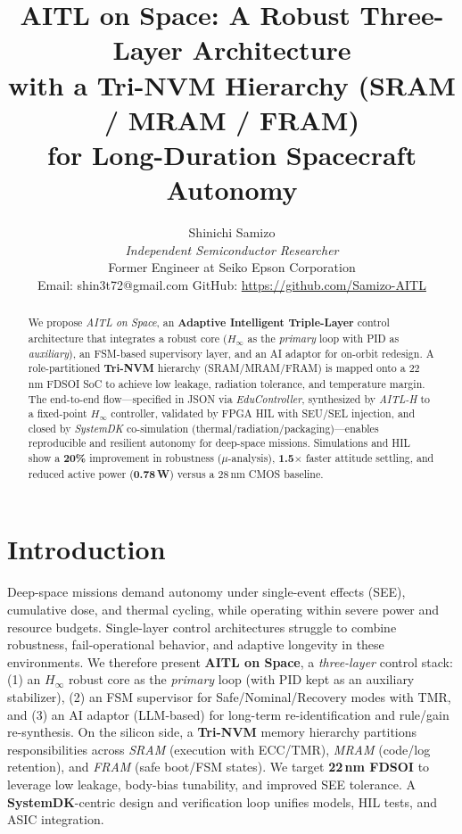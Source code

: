 \documentclass[conference]{IEEEtran}
\begin{document}
\title{AITL on Space: A Robust Three-Layer Architecture\\
with a Tri-NVM Hierarchy (SRAM / MRAM / FRAM)\\
for Long-Duration Spacecraft Autonomy}

\author{%
Shinichi Samizo\\
\emph{Independent Semiconductor Researcher}\\
Former Engineer at Seiko Epson Corporation\\
Email: shin3t72@gmail.com \quad GitHub: \url{https://github.com/Samizo-AITL}
}

\maketitle

\begin{abstract}
We propose \emph{AITL on Space}, an \textbf{Adaptive Intelligent Triple-Layer} control
architecture that integrates a robust core ($H_\infty$ as the \emph{primary} loop with PID as
\emph{auxiliary}), an FSM-based supervisory layer, and an AI adaptor for on-orbit redesign.
A role-partitioned \textbf{Tri-NVM} hierarchy (SRAM/MRAM/FRAM) is mapped onto a 22\,nm FDSOI
SoC to achieve low leakage, radiation tolerance, and temperature margin. The end-to-end
flow---specified in JSON via \emph{EduController}, synthesized by \emph{AITL-H} to a fixed-point
$H_\infty$ controller, validated by FPGA HIL with SEU/SEL injection, and closed by \emph{SystemDK}
co-simulation (thermal/radiation/packaging)---enables reproducible and resilient autonomy for
deep-space missions. Simulations and HIL show a \textbf{20\%} improvement in robustness
($\mu$-analysis), \textbf{1.5$\times$} faster attitude settling, and reduced active power
(\textbf{0.78\,W}) versus a 28\,nm CMOS baseline.
\end{abstract}

\section{Introduction}
Deep-space missions demand autonomy under single-event effects (SEE), cumulative dose,
and thermal cycling, while operating within severe power and resource budgets.
Single-layer control architectures struggle to combine robustness, fail-operational
behavior, and adaptive longevity in these environments. We therefore present
\textbf{AITL on Space}, a \emph{three-layer} control stack:
(1) an $H_\infty$ robust core as the \emph{primary} loop (with PID kept as an
auxiliary stabilizer), (2) an FSM supervisor for Safe/Nominal/Recovery modes with TMR,
and (3) an AI adaptor (LLM-based) for long-term re-identification and rule/gain
re-synthesis. On the silicon side, a \textbf{Tri-NVM} memory hierarchy partitions
responsibilities across \emph{SRAM} (execution with ECC/TMR), \emph{MRAM} (code/log retention),
and \emph{FRAM} (safe boot/FSM states). We target \textbf{22\,nm FDSOI} to leverage low leakage,
body-bias tunability, and improved SEE tolerance. A \textbf{SystemDK}-centric design and
verification loop unifies models, HIL tests, and ASIC integration.
\end{document}

